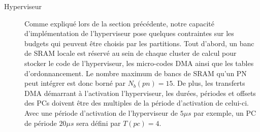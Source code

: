 \documentclass[main.tex]{subfiles}
\begin{document}
\begin{description}
\begin{enumerate}
        \end{enumerate}
    \item[Hyperviseur]
        Comme expliqué lors de la section précédente, notre capacité d'implémentation de l'hyperviseur pose quelques contraintes sur les budgets qui peuvent être choisis par les partitions. Tout d'abord, un banc de SRAM locale est réservé au sein de chaque cluster de calcul pour stocker le code de l'hyperviseur, les micro-codes DMA ainsi que les tables d'ordonnancement. Le nombre maximum de bancs de SRAM qu'un PN peut intégrer est donc borné par $N_b(pn) = 15$. De plus, les transferts DMA démarrant à l'activation l'hyperviseur, les durées, périodes et offsets des PCs doivent être des multiples de la période d'activation de celui-ci. Avec une période d'activation de l'hyperviseur de $5 \mu s$ par exemple, un PC de période $20 \mu s$ sera défini par $T(pc) = 4$.
\end{description}
\end{document}
